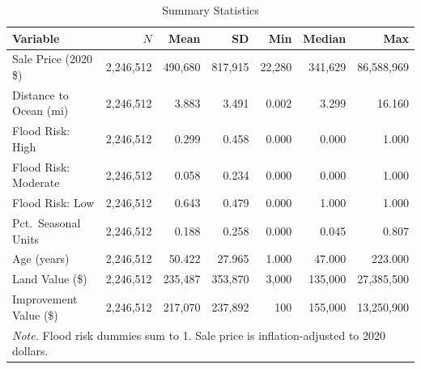 \begin{table}[h!]
\centering
\caption{Summary Statistics}
\label{tab:sumstats}
\begin{tabular}{lrrrrrr}
\toprule
Variable & $N$ & Mean & SD & Min & Median & Max \\
\midrule
Sale Price (2020 \$) & 2,246,512 & 490,680 & 817,915 & 22,280 & 341,629 & 86,588,969 \\
Distance to Ocean (mi) & 2,246,512 & 3.883 & 3.491 & 0.002 & 3.299 & 16.160 \\
Flood Risk: High & 2,246,512 & 0.299 & 0.458 & 0.000 & 0.000 & 1.000 \\
Flood Risk: Moderate & 2,246,512 & 0.058 & 0.234 & 0.000 & 0.000 & 1.000 \\
Flood Risk: Low & 2,246,512 & 0.643 & 0.479 & 0.000 & 1.000 & 1.000 \\
Pct.\ Seasonal Units & 2,246,512 & 0.188 & 0.258 & 0.000 & 0.045 & 0.807 \\
Age (years) & 2,246,512 & 50.422 & 27.965 & 1.000 & 47.000 & 223.000 \\
Land Value (\$) & 2,246,512 & 235,487 & 353,870 & 3,000 & 135,000 & 27,385,500 \\
Improvement Value (\$) & 2,246,512 & 217,070 & 237,892 & 100 & 155,000 & 13,250,900 \\
\bottomrule
\multicolumn{7}{l}{\footnotesize \textit{Note.} Flood risk dummies sum to 1. Sale price is inflation-adjusted to 2020 dollars.} \\
\end{tabular}
\end{table}
